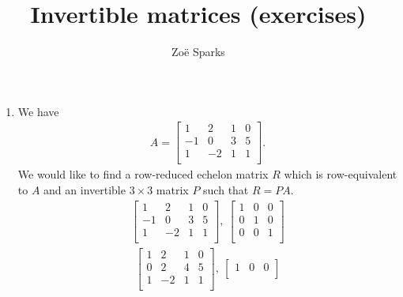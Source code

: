 \documentclass[12pt]{article}
\title{Invertible matrices (exercises)}
\author{Zoë Sparks}
\begin{document}
\theoremstyle{definition}

\newtheorem{thm}{Theorem}
\newtheorem*{nthm}{Theorem}
\newtheorem{sthm}{}[thm]
\newtheorem{lemma}{Lemma}[thm]
\newtheorem*{nlemma}{Lemma}
\newtheorem{cor}{Corollary}[thm]
\newtheorem*{prop}{Property}
\newtheorem*{defn}{Definition}
\newtheorem*{comm}{Comment}
\newtheorem*{exm}{Example}

\maketitle

\begin{enumerate}
  \item We have
    \begin{align*}
      A =
      \begin{bmatrix}
        1  & 2  & 1 & 0\\
        -1 & 0  & 3 & 5\\
        1  & -2 & 1 & 1\\
      \end{bmatrix}.
    \end{align*}
    We would like to find a row-reduced echelon matrix $R$ which
    is row-equivalent to $A$ and an invertible $3 \times 3$
    matrix $P$ such that $R = PA$.
    \begin{align*}
      \begin{bmatrix}
        1  & 2  & 1 & 0\\
        -1 & 0  & 3 & 5\\
        1  & -2 & 1 & 1\\
      \end{bmatrix},\
      \begin{bmatrix}
        1 & 0 & 0\\
        0 & 1 & 0\\
        0 & 0 & 1\\
      \end{bmatrix}
    \end{align*}
    \begin{align*}
      \begin{bmatrix}
        1  & 2  & 1 & 0\\
        0  & 2  & 4 & 5\\
        1  & -2 & 1 & 1\\
      \end{bmatrix},\
      \begin{bmatrix}
        1 & 0 & 0\\

\end{bmatrix}
\end{align*}
\end{enumerate}
\end{document}
